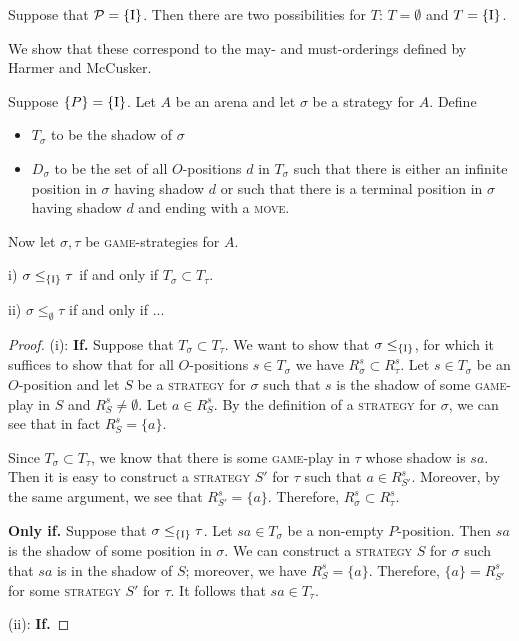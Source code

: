\documentclass{article}
\newcommand{\game}{\textsc{game}}
\newcommand{\move}{\textsc{move}}
\newcommand{\strategy}{\textsc{strategy}}
\begin{document}
Suppose that $\P=\{\RN{1}\}$.  
Then there are two possibilities for $T$: $T=\emptyset$ and $T=\{\RN{1}\}$.

We show that these correspond to the may- and must-orderings defined by Harmer and McCusker.

\begin{proposition}
  Suppose $\{P\}=\{\RN{1}\}$.  Let $A$ be an arena and let $\sigma$ be a strategy for $A$.  
  Define
  \begin{itemize}
    \item $T_\sigma$ to be the shadow of $\sigma$
    \item $D_\sigma$ to be the set of all $O$-positions $d$ in $T_\sigma$ such that there is either an infinite position in $\sigma$ having shadow $d$ or such that there is a terminal position in $\sigma$ having shadow $d$ and ending with a \move{}.
  \end{itemize}

  Now let $\sigma,\tau$ be \game{}-strategies for $A$.

  i) $\sigma \le_{\{\RN{1}\}} \tau$ if and only if $T_\sigma \subset T_\tau$.
  
  ii) $\sigma \le_\emptyset \tau$ if and only if ...
\end{proposition}

\begin{proof}

  (i): \textbf{If. }
  Suppose that $T_\sigma\subset T_\tau$.  
  We want to show that $\sigma\le_{\{\RN{1}\}}$, for which it suffices to show that for all $O$-positions $s\in T_\sigma$ we have $R_\sigma^s\subset R_\tau^s$.  
  Let $s\in T_\sigma$ be an $O$-position and let $S$ be a \strategy{} for $\sigma$ such that $s$ is the shadow of some \game{}-play in $S$ and $R_S^s\ne\emptyset$.  
  Let $a\in R_S^s$.  
  By the definition of a \strategy{} for $\sigma$, we can see that in fact $R_S^s=\{a\}$.  

  Since $T_\sigma\subset T_\tau$, we know that there is some \game{}-play in $\tau$ whose shadow is $sa$.  
  Then it is easy to construct a \strategy{} $S'$ for $\tau$ such that $a\in R_{S'}^s$.  
  Moreover, by the same argument, we see that $R_{S'}^s=\{a\}$.  
  Therefore, $R_\sigma^s\subset R_\tau^s$.  

  \textbf{Only if. }
  Suppose that $\sigma\le_{\{\RN{1}\}}\tau$.  
  Let $sa\in T_\sigma$ be a non-empty $P$-position.  
  Then $sa$ is the shadow of some position in $\sigma$.  
  We can construct a \strategy{} $S$ for $\sigma$ such that $sa$ is in the shadow of $S$; moreover, we have $R_S^s=\{a\}$.  
  Therefore, $\{a\}=R_{S'}^s$ for some \strategy{} $S'$ for $\tau$.  
  It follows that $sa\in T_\tau$.

  (ii): \textbf{If. }
  

\end{proof}
\end{document}
